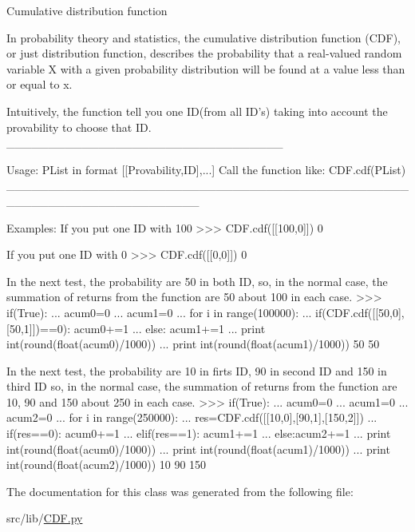 \begin{DoxyVerb}Cumulative distribution function

In probability theory and statistics, the cumulative distribution function (CDF),
or just distribution function, describes the probability that a real-valued random
variable X with a given probability distribution will be found at a value less than or
equal to x.

Intuitively, the function tell you one ID(from all ID's) taking into account the provability
to choose that ID.
_________________________________

Usage:
PList in format [[Provability,ID],...]
Call the function like: CDF.cdf(PList)
_______________________________________________________________________

Examples:
If you put one ID with 100%
>>> CDF.cdf([[100,0]])
0

If you put one ID with 0%
>>> CDF.cdf([[0,0]])
0

In the next test, the probability are 50 in both ID, so, in the normal case, the summation
of returns from the function are 50 about 100 in each case.
>>> if(True):
...     acum0=0
...     acum1=0
...     for i in range(100000):
...         if(CDF.cdf([[50,0],[50,1]])==0): acum0+=1
...         else: acum1+=1
...     print int(round(float(acum0)/1000))
...     print int(round(float(acum1)/1000))
50
50

In the next test, the probability are 10 in firts ID, 90 in second ID and 150 in third ID
so, in the normal case, the summation of returns from the function are 10, 90 and 150 about 250
in each case.
>>> if(True):
...     acum0=0
...     acum1=0
...     acum2=0
...     for i in range(250000):
...         res=CDF.cdf([[10,0],[90,1],[150,2]])
...         if(res==0): acum0+=1
...         elif(res==1): acum1+=1
...         else:acum2+=1
...     print int(round(float(acum0)/1000))
...     print int(round(float(acum1)/1000))
...     print int(round(float(acum2)/1000))
10
90
150
\end{DoxyVerb}
 

The documentation for this class was generated from the following file\-:\begin{DoxyCompactItemize}
\item 
src/lib/\hyperlink{_c_d_f_8py}{C\-D\-F.\-py}\end{DoxyCompactItemize}

